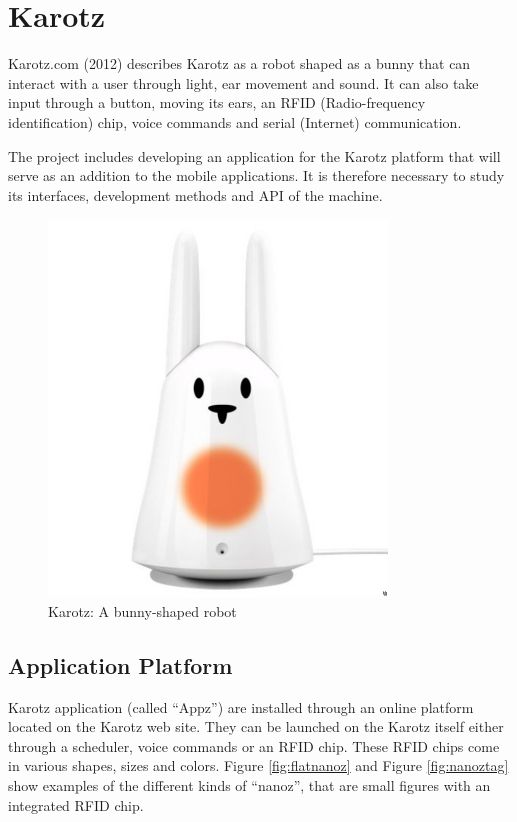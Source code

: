 \section{Karotz}
Karotz.com (2012)\cite{karotz} describes Karotz as a robot shaped 
as a bunny that can interact with
a user through light, ear movement and sound. It can also take
input through a button, moving its ears, an RFID (Radio-frequency identification) chip, voice
commands and serial (Internet) communication.

The project includes developing an application for the Karotz
platform that will serve as an addition to the mobile applications.
It is therefore necessary to study its interfaces, development
methods and API of the machine.

\begin{figure}[h]
	\centering
		\includegraphics[height=10cm]{Pictures/karotzimg}
	\caption{Karotz: A bunny-shaped robot}
	\label{fig:karotz}
\end{figure}

\subsection{Application Platform}
Karotz application (called ``Appz'') are installed through an
online platform located on the Karotz web site. They can be
launched on the Karotz itself either through a scheduler, voice
commands or an RFID chip. These RFID chips come in various shapes,
sizes and colors. Figure \ref{fig:flatnanoz} and Figure 
\ref{fig:nanoztag} show examples of the different kinds of ``nanoz'',
that are small figures with an integrated RFID chip.

